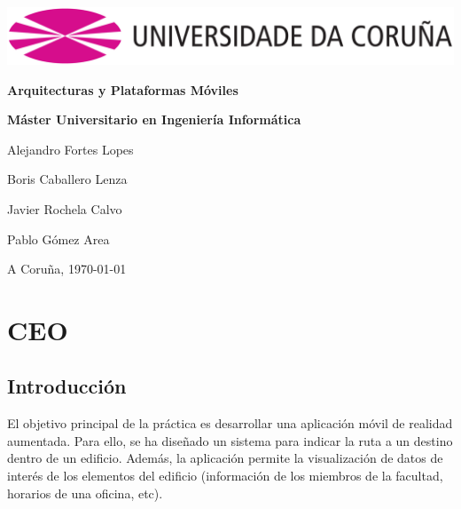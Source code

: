\documentclass[12pt, a4paper, titlepage]{article}
\begin{document}
	\begin{titlepage}
	\includegraphics[width=15cm]{img/Simbolo_logo_UDC.png}
	\vspace{6cm}
		\begin{center}
			\Huge{\textbf{Arquitecturas y Plataformas Móviles}}

			\large{\textbf{Máster Universitario en Ingeniería Informática}}

		\end{center}
		\vspace{10cm}
		\begin{flushright}

			Alejandro Fortes Lopes

			Boris Caballero Lenza

			Javier Rochela Calvo

			Pablo Gómez Area

		\end{flushright}

		\vspace{1cm}
		\begin{flushright}
			A Coruña, \today
		\end{flushright}


	\end{titlepage}

	\clearpage

	\tableofcontents

	\clearpage

	\section{CEO}
	
	\subsection{Introducción}
	
	El objetivo principal de la práctica es desarrollar una aplicación móvil de realidad aumentada. Para ello, se ha diseñado un sistema para indicar la ruta a un destino dentro de un edificio. Además, la aplicación permite la visualización de datos de interés de los elementos del edificio (información de los miembros de la facultad, horarios de una oficina, etc).
	
\end{document}
